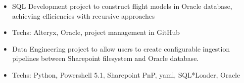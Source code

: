 \documentclass[10pt,a4paper]{altacv}
\begin{document}



\begin{itemize}
  \item \small{SQL Development project to construct flight models in Oracle database, achieving efficiencies with recursive approaches}
  \item Techs: Alteryx, Oracle, project management in GitHub
\end{itemize}

\divider


\begin{itemize}
  \item \small{Data Engineering project to allow users to create configurable ingestion pipelines between Sharepoint filesystem and Oracle database.}
  \item Techs: Python, Powershell 5.1, Sharepoint PnP, yaml, SQL*Loader, Oracle
\end{itemize}




%
%
%

%


%

\end{document}
